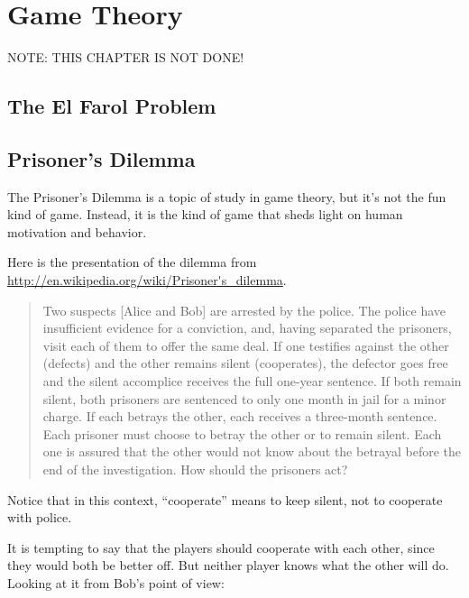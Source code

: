 \documentclass[12pt]{book}
\theoremstyle{exercise}
\begin{document}
\chapter{Game Theory}

NOTE: THIS CHAPTER IS NOT DONE!

\section{The El Farol Problem}

\section{Prisoner's Dilemma}

\label{prisoners}


The Prisoner's Dilemma is a topic of study in game theory, but
it's not the fun kind of game.  Instead, it is the kind of game
that sheds light on human motivation and behavior.


Here is the presentation of the dilemma from
\url{http://en.wikipedia.org/wiki/Prisoner's_dilemma}.

\begin{quote}
Two suspects [Alice and Bob] are arrested by the police.  The police
have insufficient evidence for a conviction, and, having separated the
prisoners, visit each of them to offer the same deal.  If one
testifies against the other (defects) and the
other remains silent (cooperates), the defector goes free and the
silent accomplice receives the full one-year sentence.  If both remain
silent, both prisoners are sentenced to only one month in jail for a
minor charge. If each betrays the other, each receives a three-month
sentence. Each prisoner must choose to betray the other or to remain
silent. Each one is assured that the other would not know about the
betrayal before the end of the investigation.  How should the
prisoners act?
\end{quote}

Notice that in this context, ``cooperate'' means to keep silent,
not to cooperate with police.

It is tempting to say that the players should cooperate with each
other, since they would both be better off.  But neither player knows
what the other will do.  Looking at it from Bob's point of view:
\end{document}
